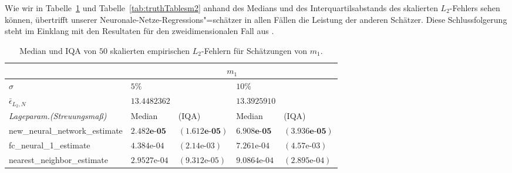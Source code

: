 
Wie wir in Tabelle~\ref{tab:truthTablesm1} und Tabelle~\ref{tab:truthTablesm2} anhand des Medians und des Interquartilsabstands des skalierten $L_2$-Fehlers sehen können, übertrifft unserer Neuronale-Netze-Regressions"=schätzer in allen Fällen die Leistung der anderen Schätzer. Diese Schlussfolgerung steht im Einklang mit den Resultaten für den zweidimensionalen Fall aus \cite[Tabel 1]{kohler19} .
\begin{table}
\centering
\begin{tabular}{ |p{5cm}||p{1.7cm} p{2cm}|p{1.7cm} p{2cm}|}
 \hline
 & \multicolumn{4}{|c|}{$m_1$}\\
 \hline
 $\sigma$& $5\%$& & $10\%$ &\\
 \hline
 $\bar{\epsilon}_{L_2,N}$& $13.4482362$ & & $13.3925910$ & \\
 \hline
 \textit{Lageparam.\@ (Streuungsmaß) }&  Median &(IQA) &  Median &(IQA)   \\
 \hline
new\_neural\_network\_estimate & $\mathbf{2.482\textbf{e-}05}$& $\mathbf{(1.612\textbf{e-}05)}$   & $\mathbf{6.908\textbf{e-}05}$&$\mathbf{ (3.936\textbf{e-}05)}$  \\
 fc\_neural\_1\_estimate & $4.384\text{e-}04$&$(2.14\text{e-}03)$ &   $7.261\text{e-}04$&$(4.57\text{e-}03)$ \\
 nearest\_neighbor\_estimate & $2.9527\text{e-}04$&$(9.312\text{e-}05)$ & $9.0864\text{e-}04$&$(2.895\text{e-}04)$\\
 \hline
\end{tabular}
    \caption{Median und IQA von $50$ skalierten empirischen $L_2$-Fehlern für Schätzungen von $m_1$.}
     \label{tab:truthTablesm1}   
\end{table}

